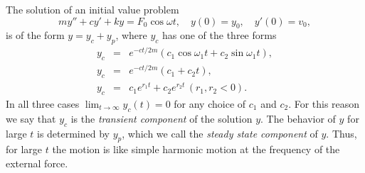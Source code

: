 The solution of an initial value problem
\[
  my''+cy'+ky=F_{0}\cos\omega t,\quad y(0)=y_{0},\quad y'(0)=v_{0},
\]
is of the form $y=y_{c}+y_{p}$, where $y_{c}$ has one of the three forms
\begin{eqnarray*}
  y_{c} & = & e^{-ct/2m}(c_{1}\cos\omega_{1}t+c_{2}\sin\omega_{1}t), \\
  y_{c} & = & e^{-ct/2m}(c_{1}+c_{2}t),                              \\
  y_{c} & = & c_{1}e^{r_{1}t}+c_{2}e^{r_{2}t}\,(r_{1},r_{2}<0).
\end{eqnarray*}
In all three cases $\lim_{t\to\infty}y_{c}(t)=0$ for any choice of $c_{1}$ and $c_{2}$. For this
reason we say that $y_{c}$ is the {\color{blue}\it transient component} of the solution $y$. The
behavior of $y$ for large $t$ is determined by $y_{p}$, which we call the {\color{blue}\it steady
state component} of $y$. Thus, for large $t$ the motion is like simple harmonic motion at the
frequency of the external force.


